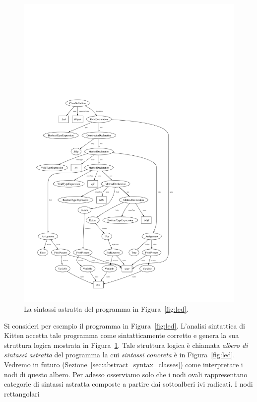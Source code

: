 \begin{figure}
\begin{center}
\includegraphics[width=16cm]{led_logica.jpg}
\end{center}
\caption{La sintassi astratta del programma in Figura~\ref{fig:led}.}
  \label{fig:led_albero}
\end{figure}
%
Si consideri per esempio il programma in Figura~\ref{fig:led}. L'analisi
sintattica di Kitten accetta tale programma come sintatticamente corretto
e genera la sua struttura logica mostrata in Figura~\ref{fig:led_albero}.
Tale struttura logica \`e chiamata \emph{albero di sintassi astratta}
del programma la cui \emph{sintassi concreta} \`e in Figura~\ref{fig:led}.
Vedremo in futuro (Sezione~\ref{sec:abstract_syntax_classes})
come interpretare i nodi di questo albero. Per adesso
osserviamo solo che i nodi ovali rappresentano categorie di sintassi
astratta composte a partire dai sottoalberi ivi radicati. I nodi rettangolari
